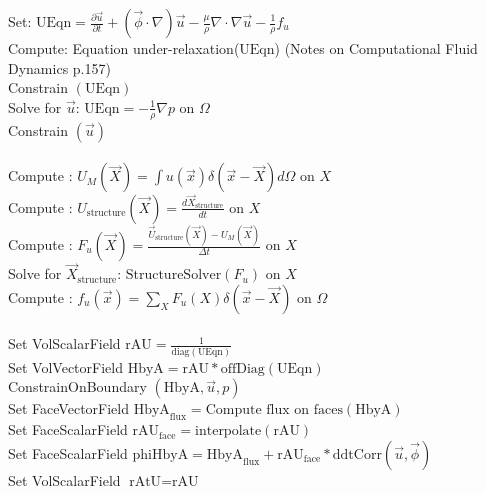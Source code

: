 \documentclass[10pt]{article} %
\begin{document}
\begin{algorithm}[H]
	\SetAlgoLined
	{
		{
			Set: $\text{UEqn} = \frac{\partial \vec{u}}{\partial t} + (\vec{\phi} \cdot \nabla) \vec{u} - \frac{\mu}{\rho} \nabla \cdot \nabla \vec{u} - \frac{1}{\rho}f_u$\\
			Compute: Equation under-relaxation($\text{UEqn}$) (Notes on Computational Fluid Dynamics p.157)\\
			Constrain $(\text{UEqn})$\\
			Solve for $\vec{u}$: $\text{UEqn} = - \frac{1}{\rho} \nabla p $ \quad on $\Omega$\\
			Constrain $(\vec{u})$\\
			\quad \\
			Compute : $U_M (\vec{X}) = \int u(\vec{x}) \delta(\vec{x}-\vec{X}) d \Omega$ \quad on $X$\\
			Compute : $U_{\text{structure}} (\vec{X}) = \frac{d \vec{X}_{\text{structure}}}{dt}$ \quad on $X$\\
			Compute : $F_u (\vec{X}) = \frac{\vec{U}_\text{structure} (\vec{X}) - U_M(\vec{X})}{\Delta t}$ \quad on $X$\\
			Solve for $\vec{X}_\text{structure}$: $\text{StructureSolver}(F_u)$ \quad on $X$\\
			Compute : $f_u (\vec{x}) = \sum_{X} F_u (X) \delta (\vec{x}-\vec{X})$ \quad on $\Omega$\\
			\quad \\
			{
				Set VolScalarField $\text{rAU} =  \frac{1}{\text{diag}(\text{UEqn})}$\\
				Set VolVectorField $\text{HbyA} =  \text{rAU}*\text{offDiag}(\text{UEqn})$\\
				ConstrainOnBoundary $(\text{HbyA},\vec{u},p)$\\
				\quad Set FaceVectorField $\text{HbyA}_{\text{flux}} =  \text{Compute flux on faces}(\text{HbyA})$\\
				\quad Set FaceScalarField $\text{rAU}_{\text{face}} =  \text{interpolate}(\text{rAU})$\\
				Set FaceScalarField $\text{phiHbyA} = \text{HbyA}_{\text{flux}} + \text{rAU}_{\text{face}}*\text{ddtCorr}(\vec{u},\vec{\phi}) $\\
				Set VolScalarField $\text{rAtU} = \text{rAU}$\\
}}}
\end{algorithm}
\end{document}
